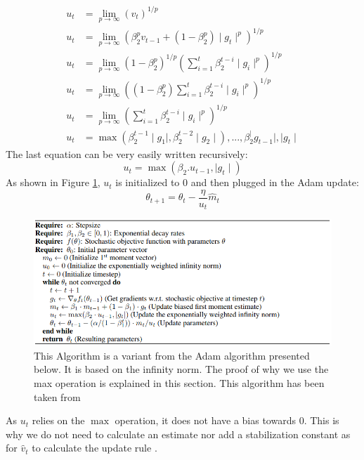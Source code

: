 \begin{subequations}
\begin{align}
u_t & = \lim_{p\to\infty}(v_t)^{1/p} \\
u_t & = \lim_{p\to\infty}(\beta_2^p v_{t-1} + (1 - \beta_2^p)\mid g_t\mid^p)^{1/p} \\
u_t & = \lim_{p\to\infty}(1 - \beta_2^p)^{1/p}(\sum_{i=1}^{t}\beta_2^{t-i} \mid g_i\mid ^p)^{1/p} \\
u_t & = \lim_{p\to\infty}((1 - \beta_2^p) \sum_{i=1}^{t}\beta_2^{t-i} \mid g_i\mid ^p)^{1/p} \\
u_t & = \lim_{p\to\infty}(\sum_{i=1}^{t}\beta_2^{t-i} \mid g_i\mid ^p)^{1/p} \\
u_t & = \max (\beta_2^{t-1}  \mid g_1\mid, \beta_2^{t-2}  \mid g_2\mid ), ..., \beta_2^ \mid  g_{t-1}\mid, \mid g_t\mid
\end{align}
\end{subequations}
The last equation can be very easily written recursively: 
\begin{equation}
    u_t = \max(\beta_2 . u_{t-1},  \mid g_t\mid)
\end{equation}
As shown in Figure \ref{fig:adamax_algo}, \(u_t\) is initialized to 0 and then plugged in the Adam update: 
\begin{equation}
  \theta_{t+1} = \theta_t - \frac{\eta}{u_t} \hat{m}_t
\end{equation}

\begin{figure}[!htp]
    \centering
        \includegraphics[width=1\textwidth]{figures/02-adamax_algo}
        \caption[Adamax Algorithm]{ This Algorithm is a variant from the Adam algorithm presented below. It is based on the infinity norm. The proof of why we use the max operation is explained in this section. This algorithm has been taken from \cite{adam}}\label{fig:adamax_algo}
\end{figure}

As \(u_t\) relies on the \(\max\) operation, it does not have a bias towards 0. This is why we do not need to calculate an estimate nor add a stabilization constant as for \(\hat{v}_t\) to calculate the update rule \cite{adam}.

